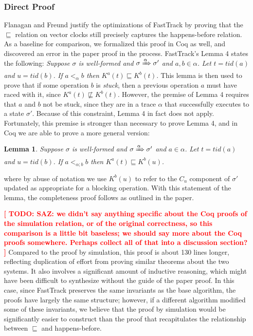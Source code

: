 \documentclass[preprint, 10pt]{sigplanconf}
\newcommand{\TODO}[1]{\textbf{\textcolor{red}{[ TODO: #1]}}}
\newtheorem{lemma}{Lemma}
\begin{document}
\subsubsection{Direct Proof}
\label{bug}
Flanagan and Freund justify the optimizations of FastTrack by proving that the $\sqsubseteq$ relation on vector clocks still precisely captures the happens-before relation. As a baseline for comparison, we formalized this proof in Coq as well, and discovered an error in the paper proof in the process. FastTrack's Lemma 4 states the following: {\it Suppose $\sigma$ is well-formed and $\sigma \xRightarrow{\alpha} \sigma'$ and $a, b \in \alpha$. Let $t = \mathit{tid}(a)$ and $u = \mathit{tid}(b)$. If $a <_{\alpha} b$ then $K^a(t) \sqsubseteq K^b(t)$.} This lemma is then used to prove that if some operation $b$ is \emph{stuck}, then a previous operation $a$ must have raced with it, since $K^a(t) \not\sqsubseteq K^b(t)$. However, the premise of Lemma 4 requires that $a$ and $b$ not be stuck, since they are in a trace $\alpha$ that successfully executes to a state $\sigma'$. Because of this constraint, Lemma 4 in fact does not apply. Fortunately, this premise is stronger than necessary to prove Lemma 4, and in Coq we are able to prove a more general version:
\begin{lemma}Suppose $\sigma$ is well-formed and $\sigma \xRightarrow{\alpha} \sigma'$ and $a \in \alpha$. Let $t = \mathit{tid}(a)$ and $u = \mathit{tid}(b)$. If $a <_{\alpha; b} b$ then $K^a(t) \sqsubseteq K^b(u)$.\end{lemma}
\noindent where by abuse of notation we use $K^b(u)$ to refer to the $C_u$ component of $\sigma'$ updated as appropriate for a blocking operation. With this statement of the lemma, the completeness proof follows as outlined in the paper.

\TODO{SAZ: we didn't say anything specific about the Coq proofs of the simulation relation, or of the original correctness, so this comparison is a little bit baseless; we should say more about the Coq proofs somewhere. Perhaps collect all of that into a discussion section? }
Compared to the proof by simulation, this proof is about 130 lines longer, reflecting duplication of effort from proving similar theorems about the two systems. It also involves a significant amount of inductive reasoning, which might have been difficult to synthesize without the guide of the paper proof. In this case, since FastTrack preserves the same invariants as the base algorithm, the proofs have largely the same structure; however, if a different algorithm modified some of these invariants, we believe that the proof by simulation would be significantly easier to construct than the proof that recapitulates the relationship between $\sqsubseteq$ and happens-before.
\end{document}
